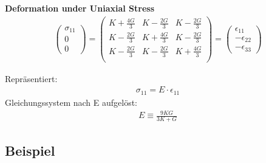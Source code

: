 \documentclass[a4paper]{scrartcl}
\begin{document}
\textbf{Deformation under Uniaxial Stress}\\
\begin{align}
\begin{pmatrix}
\sigma_{11}\\
0\\
0
\end{pmatrix} = 
\begin{pmatrix}
K + \frac{4G}{3} & K - \frac{2G}{3} & K - \frac{2G}{3}\\
K - \frac{2G}{3} & K + \frac{4G}{3} & K - \frac{2G}{3}\\
K - \frac{2G}{3} & K - \frac{2G}{3} & K + \frac{4G}{3}\\
\end{pmatrix} =
\begin{pmatrix}
\epsilon_{11}\\
- \epsilon_{22}\\
- \epsilon_{33}
\end{pmatrix}
\end{align}

Repräsentiert:
\begin{align}
\sigma_{11} = E \cdot \epsilon_{11}
\end{align}
Gleichungssystem nach E aufgelöst:
\begin{align}
E \equiv \frac{9 K G}{3K + G}
\end{align}


\subsection{Beispiel}
\end{document}

